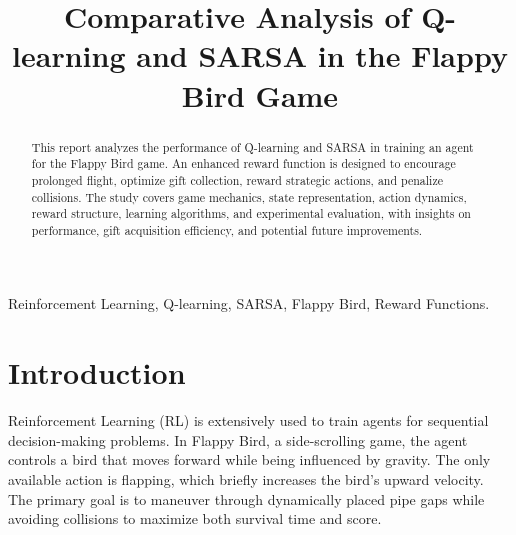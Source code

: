 \documentclass[conference]{IEEEtran}
\begin{document}
\title{Comparative Analysis of Q-learning and SARSA in the Flappy Bird Game}


\author{
\and
{}
}

\maketitle

\begin{abstract}
This report analyzes the performance of Q-learning and SARSA in training an agent for the Flappy Bird game. An enhanced reward function is designed to encourage prolonged flight, optimize gift collection, reward strategic actions, and penalize collisions. The study covers game mechanics, state representation, action dynamics, reward structure, learning algorithms, and experimental evaluation, with insights on performance, gift acquisition efficiency, and potential future improvements.
\end{abstract}

\begin{IEEEkeywords}
Reinforcement Learning, Q-learning, SARSA, Flappy Bird, Reward Functions.
\end{IEEEkeywords}

\section{Introduction}

Reinforcement Learning (RL) is extensively used to train agents for sequential decision-making problems. In Flappy Bird, a side-scrolling game, the agent controls a bird that moves forward while being influenced by gravity. The only available action is flapping, which briefly increases the bird's upward velocity. The primary goal is to maneuver through dynamically placed pipe gaps while avoiding collisions to maximize both survival time and score.
\end{document}
